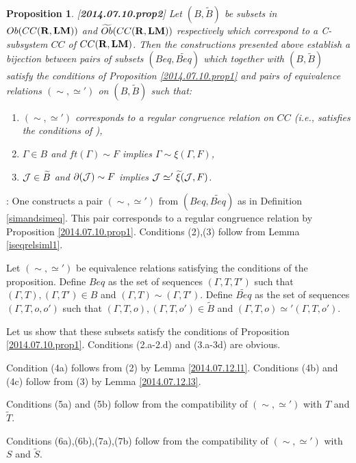 \documentclass[11pt]{article}
\newenvironment{proof}{{\bf Proof}:}{\vskip 5mm }
\newtheorem{proposition}{Proposition}[subsection]
\newcommand{\llabel}[1]{\label{#1}[{\bf #1}]}
\newcommand{\rr}{{\bf R}}
\newcommand{\lm}{{\bf LM}}
\newcommand{\wt}{\widetilde}
\begin{document}
\begin{proposition}
\llabel{2014.07.10.prop2}
Let $(B,\wt{B})$ be subsets in $Ob(CC(\rr,\lm))$ and $\wt{Ob}(CC(\rr,\lm))$ respectively which correspond to a C-subsystem $CC$ of $CC(\rr,\lm)$. Then the constructions presented above establish a bijection between pairs of subsets $(Beq,\wt{Beq})$ which together with $(B,\wt{B})$ satisfy the conditions of Proposition \ref{2014.07.10.prop1} and pairs of equivalence relations $(\sim,\simeq')$ on $(B,\wt{B})$ such that:
%
\begin{enumerate}
\item $(\sim,\simeq')$ corresponds to a regular congruence relation on $CC$ (i.e., satisfies the conditions of \cite[Proposition 5.4]{Csubsystems}),
%
\item $\Gamma\in B$ and $ft(\Gamma)\sim F$ implies $\Gamma\sim \xi(\Gamma,F)$,
%
\item ${\cal J}\in \wt{B}$ and $\partial({\cal J})\sim F$ implies ${\cal J}\simeq' \wt{\xi}({\cal J},F)$.
\end{enumerate}
\end{proposition}
%
\begin{proof}
One constructs a pair $(\sim,\simeq')$ from $(Beq,\wt{Beq})$ as in Definition \ref{simandsimeq}. 
This pair corresponds to a regular congruence relation by Proposition \ref{2014.07.10.prop1}.
Conditions (2),(3) follow from Lemma \ref{iseqrelsiml1}.

Let $(\sim,\simeq')$ be equivalence relations satisfying the conditions of the proposition. Define $Beq$ as the set of sequences $(\Gamma,T,T')$ such that $(\Gamma,T), (\Gamma,T')\in B$ and $(\Gamma,T)\sim (\Gamma,T')$. Define $\wt{Beq}$ as the set of sequences $(\Gamma,T,o,o')$ such that $(\Gamma,T,o),(\Gamma,T,o')\in \wt{B}$ and $(\Gamma,T,o)\simeq' (\Gamma,T,o')$. 

Let us show that these subsets satisfy the conditions of Proposition \ref{2014.07.10.prop1}. Conditions (2.a-2.d) and (3.a-3d) are obvious. 

Condition (4a) follows from (2) by Lemma \ref{2014.07.12.l1}.
Conditions (4b) and (4c) follow from (3) by Lemma \ref{2014.07.12.l3}.

Conditions (5a) and (5b) follow from the compatibility of $(\sim,\simeq')$ with $T$ and $\wt{T}$. 

Conditions (6a),(6b),(7a),(7b) follow from the compatibility of $(\sim,\simeq')$ with $S$ and $\wt{S}$.
\end{proof}
\end{document}
